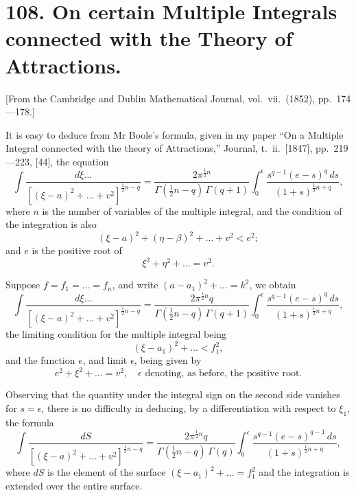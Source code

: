 \documentclass[11pt,a4paper]{article}
\theoremstyle{plain}
\begin{document}
\section*{108. On certain Multiple Integrals connected with the Theory of Attractions.}

[From the Cambridge and Dublin Mathematical Journal, vol.\ vii.\ (1852), pp.\ 174---178.]

It is easy to deduce from Mr Boole's formula, given in my paper ``On a Multiple Integral connected with the theory of Attractions,'' Journal, t.\ ii.\ [1847], pp.\ 219---223, [44], the equation
\[\int \frac{d\xi \ldots}{[(\xi-a)^2 + \ldots + v^2]^{\frac{1}{2}n-q}} = \frac{2\pi^{\frac{1}{2}n}}{\Gamma(\tfrac{1}{2}n-q)\,\Gamma(q+1)} \int_0^{\epsilon} \frac{s^{q-1}(e-s)^q\,ds}{(1+s)^{\frac{1}{2}n+q}},\]
where $n$ is the number of variables of the multiple integral, and the condition of the integration is also
\[(\xi-a)^2 + (\eta-\beta)^2 + \ldots + v^2 < e^2;\]
and $e$ is the positive root of
\[\xi^2 + \eta^2 + \ldots = v^2.\]

Suppose $f = f_1 = \ldots = f_n$, and write $(a-a_1)^2 + \ldots = k^2$, we obtain
\[\int \frac{d\xi \ldots}{[(\xi-a)^2 + \ldots + v^2]^{\frac{1}{2}n-q}} = \frac{2\pi^{\frac{1}{2}n}q}{\Gamma(\tfrac{1}{2}n-q)\,\Gamma(q+1)} \int_0^{\epsilon} \frac{s^{q-1}(e-s)^q\,ds}{(1+s)^{\frac{1}{2}n+q}},\]
the limiting condition for the multiple integral being
\[(\xi-a_1)^2 + \ldots < f_1^2,\]
and the function $e$, and limit $\epsilon$, being given by
\[e^2 + \xi^2 + \ldots = v^2, \quad \epsilon \text{ denoting, as before, the positive root.}\]

Observing that the quantity under the integral sign on the second side vanishes for $s = \epsilon$, there is no difficulty in deducing, by a differentiation with respect to $\xi_1$, the formula
\[\int \frac{dS}{[(\xi-a)^2 + \ldots + v^2]^{\frac{1}{2}n-q}} = \frac{2\pi^{\frac{1}{2}n}q}{\Gamma(\tfrac{1}{2}n-q)\,\Gamma(q)} \int_0^{\epsilon} \frac{s^{q-1}(e-s)^{q-1}\,ds}{(1+s)^{\frac{1}{2}n+q}},\]
where $dS$ is the element of the surface $(\xi-a_1)^2 + \ldots = f_1^2$ and the integration is extended over the entire surface.
\end{document}

